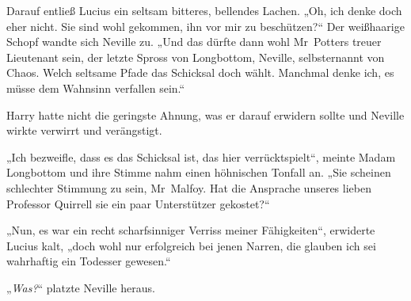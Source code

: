 Darauf entließ Lucius ein seltsam bitteres, bellendes Lachen. „Oh, ich denke doch eher nicht. Sie sind wohl gekommen, ihn vor mir zu beschützen?“ Der weißhaarige Schopf wandte sich Neville zu. „Und das dürfte dann wohl Mr~Potters treuer Lieutenant sein, der letzte Spross von Longbottom, Neville, selbsternannt von Chaos. Welch seltsame Pfade das Schicksal doch wählt. Manchmal denke ich, es müsse dem Wahnsinn verfallen sein.“

Harry hatte nicht die geringste Ahnung, was er darauf erwidern sollte und Neville wirkte verwirrt und verängstigt.

„Ich bezweifle, dass es das Schicksal ist, das hier verrücktspielt“, meinte Madam Longbottom und ihre Stimme nahm einen höhnischen Tonfall an. „Sie scheinen schlechter Stimmung zu sein, Mr~Malfoy. Hat die Ansprache unseres lieben Professor Quirrell sie ein paar Unterstützer gekostet?“

„Nun, es war ein recht scharfsinniger Verriss meiner Fähigkeiten“, erwiderte Lucius kalt, „doch wohl nur erfolgreich bei jenen Narren, die glauben ich sei wahrhaftig ein Todesser gewesen.“

„\emph{Was?}“ platzte Neville heraus.

